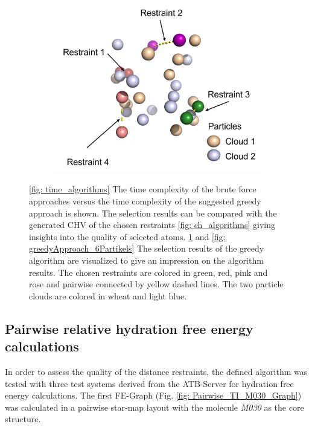 \begin{figure}[H]
\begin{subfigure}{0.45\columnwidth}
        \includegraphics[width=\textwidth]{fig/results/algorithm/punktewolke_15_greedy_annotated.png}
        \caption{}
        \label{fig: greedyApproach_15Partikels}
    \end{subfigure}
    \caption{\ref{fig: time_algorithms} The time complexity of the brute force approaches versus the time complexity of the suggested greedy approach is shown. The selection results can be compared with the generated CHV of the chosen restraints \ref{fig: ch_algorithms} giving insights into the quality of selected atoms.  \ref{fig: greedyApproach_15Partikels} and \ref{fig: greedyApproach_6Partikels} The selection results of the greedy algorithm are visualized to give an impression on the algorithm results. The chosen restraints are colored in green, red, pink and rose and pairwise connected by yellow dashed lines. The two particle clouds are colored in wheat and light blue. }
    \label{fig: ToyMOdelResults}
\end{figure}


\subsection{Pairwise relative hydration free energy calculations}
In order to assess the quality of the distance restraints, the defined algorithm was tested with three test systems derived from the ATB-Server for hydration free energy calculations. \cite{Martin2018} The first FE-Graph (Fig. \ref{fig: Pairwise_TI_M030_Graph}) was calculated in a pairwise star-map layout with the molecule \textit{M030} as the core structure. 

